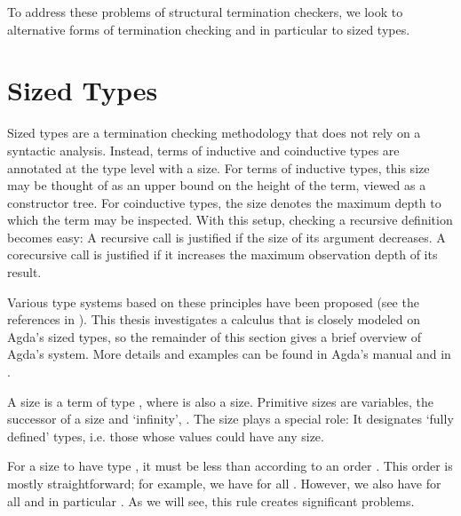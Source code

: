 To address these problems of structural termination checkers, we look to
alternative forms of termination checking and in particular to sized types.


\section{Sized Types}
\label{sec:background:sized}

Sized types are a termination checking methodology that does not rely on a
syntactic analysis. Instead, terms of inductive and coinductive types are
annotated at the type level with a size. For terms of inductive types, this size
may be thought of as an upper bound on the height of the term, viewed as a
constructor tree. For coinductive types, the size denotes the maximum depth to
which the term may be inspected. With this setup, checking a recursive
definition becomes easy: A recursive call is justified if the size of its
argument decreases. A corecursive call is justified if it increases the maximum
observation depth of its result.

Various type systems based on these principles have been proposed (see the
references in ). This thesis investigates a calculus
that is closely modeled on Agda's sized types, so the remainder of this section
gives a brief overview of Agda's system. More details and examples can be found
in Agda's manual \cite{agdamanual} and in \cite{abel2016}.

A size is a term of type , where  is also a size.
Primitive sizes are variables, the successor of a size  and
\enquote*{infinity}, . The size  plays a special role: It
designates \enquote*{fully defined} types, i.e. those whose values could have any
size.

For a size  to have type , it must be less than
 according to an order \icode{<}. This order is mostly straightforward;
for example, we have  for all . However, we also have
 for all  and in particular . As we will see,
this rule creates significant problems.

